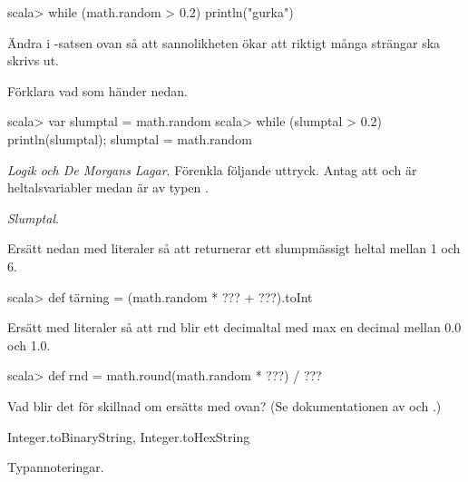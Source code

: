 {{{{\begin{REPL}
scala> while (math.random > 0.2) { println("gurka") }
\end{REPL}

\Subtask Ändra i -satsen ovan så att sannolikheten ökar att riktigt många  strängar ska skrivs ut.

\Subtask Förklara vad som händer nedan.
\begin{REPL}
scala> var slumptal = math.random
scala> while (slumptal > 0.2) { println(slumptal); slumptal = math.random }
\end{REPL}

\Task\Pen \textit{Logik och De Morgans Lagar}. Förenkla följande uttryck. Antag att  och  är heltalsvariabler medan  är av typen . 

\Subtask {}

\Subtask {}

\Subtask {}

\Subtask {}

\Subtask {}

\Subtask {}

\Subtask {}


\ExtraTasks

\Task \textit{Slumptal}.

\Subtask Ersätt  nedan med literaler så att  returnerar ett slumpmässigt heltal mellan 1 och 6.
\begin{REPL}
scala> def tärning = (math.random * ??? + ???).toInt 
\end{REPL}

\Subtask Ersätt  med literaler så att rnd blir ett decimaltal med max en decimal mellan 0.0 och 1.0.
\begin{REPL}
scala> def rnd = math.round(math.random * ???) / ??? 
\end{REPL}

\Subtask Vad blir det för skillnad om  ersätts med  ovan? (Se dokumentationen av  och .)

\AdvancedTasks

\Task Integer.toBinaryString, Integer.toHexString

\Task Typannoteringar.

}}}}
